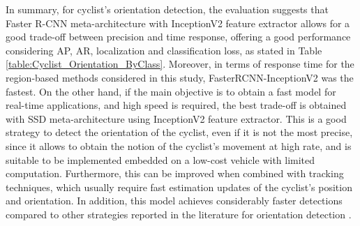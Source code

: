 \documentclass[journal]{IEEEtran}
\begin{document}
In summary, for cyclist's orientation detection, the evaluation suggests that Faster R-CNN meta-architecture with InceptionV2 feature extractor allows for a good trade-off between precision and time response, offering a good performance considering AP, AR, localization and classification loss, as stated in Table \ref{table:Cyclist_Orientation_ByClass}. Moreover, in terms of response time for the region-based methods considered in this study, FasterRCNN-InceptionV2 was the fastest. On the other hand, if the main objective is to obtain a fast model for real-time applications, and high speed is required, the best trade-off is obtained with SSD meta-architecture using InceptionV2 feature extractor. This is a good strategy to detect the orientation of the cyclist, even if it is not the most precise, since it allows to obtain the notion of the cyclist's movement at high rate, and is suitable to be implemented embedded on a low-cost vehicle with limited computation. Furthermore, this can be improved when combined with tracking techniques, which usually require fast estimation updates of the cyclist's position and orientation. In addition, this model achieves considerably faster detections compared to other strategies reported in the literature for orientation detection \cite{guindel2018fast,guindel2019traffic}.
\end{document}
